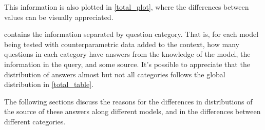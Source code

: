 This information is also plotted in \cref{total_plot}, where the differences between %
values can be visually appreciated.

 contains the information separated by question category.
That is, for each model being tested with counterparametric data added to the context, how many questions in each category have answers from the \Parametric{} knowledge of the model, the \Contextual{} information in the query, and some \Other{} source.
It's possible to appreciate that the distribution of answers almost but not all categories follows the global distribution in \cref{total_table}.

The following sections discuss the reasons for the differences in distributions of the source of these answers along different models, and in the differences between different categories.
